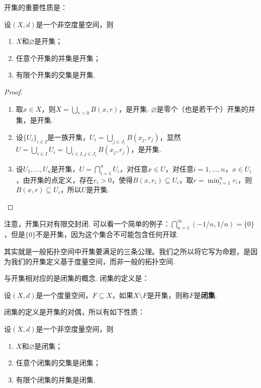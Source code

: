 开集的重要性质是：

\begin{proposition}\label{prop:open-prop}
    设$(X,d)$是一个非空度量空间，则
    \begin{enumerate}
        \item $X$和$\varnothing$是开集；
        \item 任意个开集的并集是开集；
        \item 有限个开集的交集是开集. 
    \end{enumerate}
\end{proposition}
\begin{proof}
\begin{enumerate}
    \item 取$x\in X$，则$X=\bigcup_{r>0}B(x,r)$，是开集. $\varnothing$是零个（也是若干个）开集的并集，是开集. 

    \item 设$\{U_i\}_{i\in I}$是一族开集，$U_i=\bigcup_{j\in J_i} B(x_j,r_j)$，显然$U=\bigcup_{i\in I}U_i=\bigcup_{i\in I,j\in J_i} B(x_j,r_j)$，是开集. 

    \item 设$U_1,\dots,U_n$是开集，$U=\bigcap_{i=1}^nU_i$，对任意$x\in U$，对任意$i=1,\dots,n$，$x\in U_i$，由开集的点定义，存在$r_i>0$，使得$B(x,r_i)\subseteq U_i$，取$r=\min_{i=1}^n r_i$，则$B(x,r)\subseteq U_i$，所以$U$是开集. 
\end{enumerate}
\end{proof}

注意，开集只对有限交封闭. 可以看一个简单的例子：$\bigcap_{n=1}^\infty(-1/n,1/n)=\{0\}$，但是$\{0\}$不是开集，因为这个集合不可能包含任何开球. 

 其实就是一般拓扑空间中开集要满足的三条公理。我们之所以将它写为命题，是因为我们的开集定义基于度量空间，而非一般的拓扑空间.

与开集相对应的是闭集的概念. 闭集的定义是：

\begin{definition}[闭集]
    设$(X,d)$是一个度量空间，$F\subseteq X$，如果$X\setminus F$是开集，则称$F$是\textbf{闭集}. 
\end{definition}
闭集的定义是开集的对偶，所以有如下性质：

\begin{proposition}\label{prop:closed-prop}
    设$(X,d)$是一个非空度量空间，则
    \begin{enumerate}
        \item $X$和$\varnothing$是闭集；
        \item 任意个闭集的交集是闭集；
        \item 有限个闭集的并集是闭集. 
    \end{enumerate}
\end{proposition}


